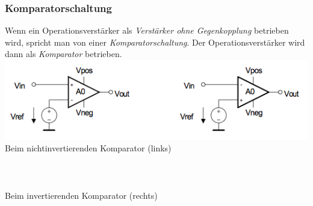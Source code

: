 \newpage

		\subsubsection{Komparatorschaltung }
			\begin{minipage}{18cm}
            	Wenn ein Operationsverstärker als {\it Verstärker ohne
            	Gegenkopplung} betrieben wird, spricht man von einer {\it
            	Komparatorschaltung}. Der Operationsverstärker wird dann als {\it
            	Komparator} betrieben.\\
            	\includegraphics[width=16cm]{./bilder/komparator.png}\\
            	Beim nichtinvertierenden Komparator (links)\\
            	\hspace*{10mm}\\
            	\hspace*{10mm}\\ \\
            	Beim invertierenden Komparator (rechts)\\
            	\hspace*{10mm}\\
            	\hspace*{10mm}\\
            \end{minipage}

